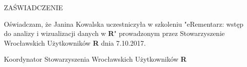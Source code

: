 \documentclass[12pt,firstpage,polish,a4paper]{letter}
\date{Wrocław, \today}
\newcommand{\memberName}{Janina Kowalska }
\begin{document}
 
\begin{letter}{}{}
 
\begin{center}\opening{ZAŚWIADCZENIE}
\end{center}

Oświadczam, że \memberName uczestniczyła w szkoleniu "eRementarz: wstęp do analizy i wizualizacji danych w \textbf{R}" prowadzonym przez Stowarzyszenie Wrocławskich Użytkowników \textbf{R} dnia 7.10.2017.


\vfill

\begin{flushright}Koordynator Stowarzyszenia Wrocławskich Użytkowników \textbf{R}
\end{flushright}
\end{letter}
\end{document}
